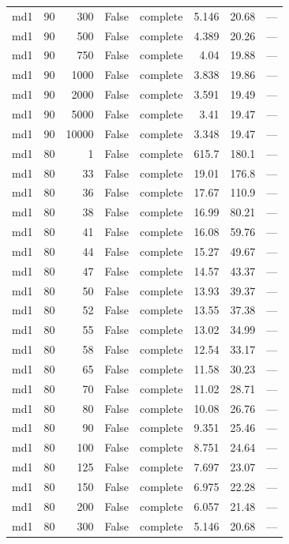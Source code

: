 \begin{tabular}{lrrrlrrl}
md1 & 90 & 300 & False & complete & 5.146 & 20.68 & — \\
md1 & 90 & 500 & False & complete & 4.389 & 20.26 & — \\
md1 & 90 & 750 & False & complete & 4.04 & 19.88 & — \\
md1 & 90 & 1000 & False & complete & 3.838 & 19.86 & — \\
md1 & 90 & 2000 & False & complete & 3.591 & 19.49 & — \\
md1 & 90 & 5000 & False & complete & 3.41 & 19.47 & — \\
md1 & 90 & 10000 & False & complete & 3.348 & 19.47 & — \\
md1 & 80 & 1 & False & complete & 615.7 & 180.1 & — \\
md1 & 80 & 33 & False & complete & 19.01 & 176.8 & — \\
md1 & 80 & 36 & False & complete & 17.67 & 110.9 & — \\
md1 & 80 & 38 & False & complete & 16.99 & 80.21 & — \\
md1 & 80 & 41 & False & complete & 16.08 & 59.76 & — \\
md1 & 80 & 44 & False & complete & 15.27 & 49.67 & — \\
md1 & 80 & 47 & False & complete & 14.57 & 43.37 & — \\
md1 & 80 & 50 & False & complete & 13.93 & 39.37 & — \\
md1 & 80 & 52 & False & complete & 13.55 & 37.38 & — \\
md1 & 80 & 55 & False & complete & 13.02 & 34.99 & — \\
md1 & 80 & 58 & False & complete & 12.54 & 33.17 & — \\
md1 & 80 & 65 & False & complete & 11.58 & 30.23 & — \\
md1 & 80 & 70 & False & complete & 11.02 & 28.71 & — \\
md1 & 80 & 80 & False & complete & 10.08 & 26.76 & — \\
md1 & 80 & 90 & False & complete & 9.351 & 25.46 & — \\
md1 & 80 & 100 & False & complete & 8.751 & 24.64 & — \\
md1 & 80 & 125 & False & complete & 7.697 & 23.07 & — \\
md1 & 80 & 150 & False & complete & 6.975 & 22.28 & — \\
md1 & 80 & 200 & False & complete & 6.057 & 21.48 & — \\
md1 & 80 & 300 & False & complete & 5.146 & 20.68 & — \\

\end{tabular}
